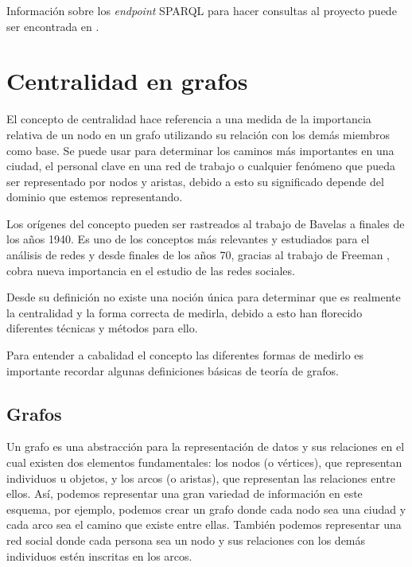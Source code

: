 Información sobre los \emph{endpoint} SPARQL para hacer consultas al proyecto
puede ser encontrada en \cite{callahan2013bio2rdf}.


\section{Centralidad en grafos}\label{ea:cent}
El concepto de centralidad hace referencia a una medida de la importancia
relativa de un nodo en un grafo utilizando su relación con los demás miembros
como base. 
Se puede usar para determinar los caminos más importantes en una ciudad, el
personal clave en una red de trabajo o cualquier fenómeno que pueda ser
representado por nodos y aristas, debido a esto su significado depende del
dominio que estemos representando.

Los orígenes del concepto pueden ser rastreados al trabajo de Bavelas a finales
de los años 1940\cite{bavelas1948mathematical}.
Es uno de los conceptos más relevantes y estudiados para el análisis de redes y
desde finales de los años 70, gracias al trabajo de Freeman 
\etal\cite{freeman1979centrality,freeman1991centrality}, 
cobra nueva importancia en el estudio de las redes sociales.

Desde su definición no existe una noción única para determinar que es realmente 
la centralidad y la forma correcta de medirla\cite{freeman1979centrality},
debido a esto han florecido diferentes técnicas y métodos para ello.

Para entender a cabalidad el concepto las diferentes formas de medirlo es
importante recordar algunas definiciones básicas de teoría de grafos.

\subsection{Grafos}
Un grafo es una abstracción para la representación de datos y sus relaciones en
el cual existen dos elementos fundamentales: los nodos (o vértices), que
representan individuos u objetos, y los arcos (o aristas), que representan las
relaciones entre ellos.
Así, podemos representar una gran variedad de información en este esquema, por
ejemplo, podemos crear un grafo donde cada nodo sea una ciudad y cada arco
sea el camino que existe entre ellas. También podemos representar una red
social donde cada persona sea un nodo y sus relaciones con los demás individuos
estén inscritas en los arcos.

